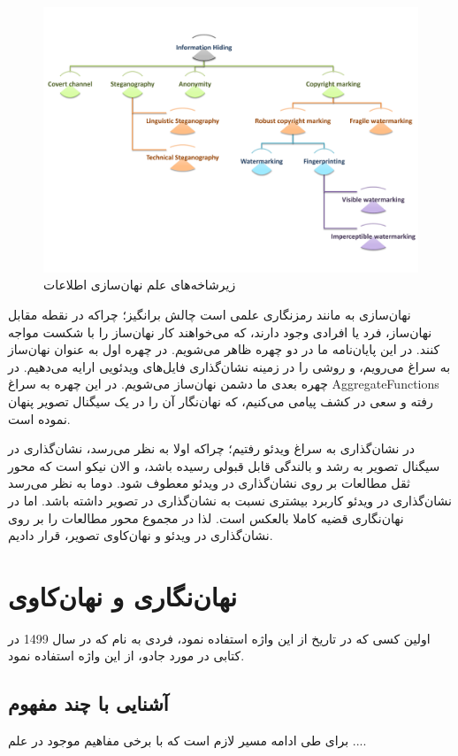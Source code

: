 \begin{figure}
\includegraphics[width=.9\textwidth ,height=.65\textwidth]{Pic/InformationHidingHierarch}
\caption{زیرشاخه‌های علم نهان‌سازی اطلاعات}
\label{InformationHidingHierarch}
\end{figure}

نهان‌سازی به مانند رمزنگاری علمی است چالش برانگیز؛ چراکه در نقطه مقابل نهان‌ساز، فرد یا افرادی وجود دارند، که می‌خواهند کار نهان‌ساز را با شکست مواجه کنند. در این پایان‌نامه ما در دو چهره ظاهر می‌شویم. در چهره اول به عنوان نهان‌ساز به سراغ  می‌رویم، و روشی را در زمینه نشان‌گذاری فایل‌های ویدئویی ارایه می‌دهیم. در چهره بعدی ما دشمن نهان‌ساز می‌شویم. در این چهره به سراغ   ‎\glspl{AggregateFunction}‎  رفته و سعی در کشف پیامی می‌کنیم، که نهان‌نگار آن را در یک سیگنال تصویر پنهان نموده است. 

در نشان‌گذاری به سراغ ویدئو رفتیم؛ چراکه اولا به نظر می‌رسد، نشان‌گذاری در سیگنال تصویر به رشد و بالندگی قابل قبولی رسیده باشد، و الان نیکو است که محور ثقل مطالعات بر روی نشان‌گذاری در ویدئو معطوف شود. دوما به نظر می‌رسد نشان‌گذاری در ویدئو کاربرد بیشتری نسبت به نشان‌گذاری در  تصویر داشته باشد. اما در نهان‌نگاری قضیه کاملا بالعکس است. لذا در مجموع محور مطالعات را بر روی نشان‌گذاری در ویدئو و نهان‌کاوی تصویر، قرار دادیم. 


\section{نهان‌نگاری و نهان‌کاوی}
\label{SteganalysisIntro}

اولین کسی که در تاریخ از این واژه استفاده نمود، فردی به نام {} که در سال 1499 در کتابی در مورد جادو، از این واژه استفاده نمود. 

\subsection{آشنایی با چند مفهوم}
برای طی ادامه مسیر لازم است که با برخی مفاهیم موجود در علم ....


